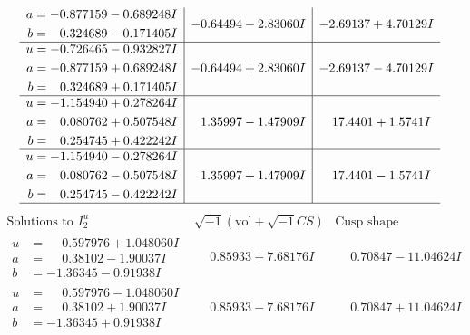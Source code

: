 \documentclass[1p]{elsarticle_modified}
\theoremstyle{definition}
\newcommand{\I}{\sqrt{-1}}
\begin{document}
$$\begin{array}{c|c|c}
\begin{aligned}
a &= -0.877159 - 0.689248 I \\
b &= \phantom{-}0.324689 - 0.171405 I\end{aligned}
 & -0.64494 - 2.83060 I & -2.69137 + 4.70129 I \\ \hline\begin{aligned}
u &= -0.726465 - 0.932827 I \\
a &= -0.877159 + 0.689248 I \\
b &= \phantom{-}0.324689 + 0.171405 I\end{aligned}
 & -0.64494 + 2.83060 I & -2.69137 - 4.70129 I \\ \hline\begin{aligned}
u &= -1.154940 + 0.278264 I \\
a &= \phantom{-}0.080762 + 0.507548 I \\
b &= \phantom{-}0.254745 + 0.422242 I\end{aligned}
 & \phantom{-}1.35997 - 1.47909 I & \phantom{-}17.4401 + 1.5741 I \\ \hline\begin{aligned}
u &= -1.154940 - 0.278264 I \\
a &= \phantom{-}0.080762 - 0.507548 I \\
b &= \phantom{-}0.254745 - 0.422242 I\end{aligned}
 & \phantom{-}1.35997 + 1.47909 I & \phantom{-}17.4401 - 1.5741 I\\
 \hline 
 \end{array}$$\newpage$$\begin{array}{c|c|c}  
\text{Solutions to }I^u_{2}& \I (\text{vol} + \sqrt{-1}CS) & \text{Cusp shape}\\
 \hline 
\begin{aligned}
u &= \phantom{-}0.597976 + 1.048060 I \\
a &= \phantom{-}0.38102 - 1.90037 I \\
b &= -1.36345 - 0.91938 I\end{aligned}
 & \phantom{-}0.85933 + 7.68176 I & \phantom{-}0.70847 - 11.04624 I \\ \hline\begin{aligned}
u &= \phantom{-}0.597976 - 1.048060 I \\
a &= \phantom{-}0.38102 + 1.90037 I \\
b &= -1.36345 + 0.91938 I\end{aligned}
 & \phantom{-}0.85933 - 7.68176 I & \phantom{-}0.70847 + 11.04624 I \\ \hline\begin{aligned}

\end{aligned}
\end{array}$$
\end{document}
